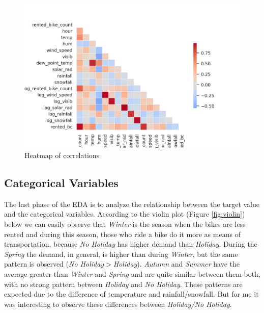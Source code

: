 \documentclass[11pt, a4]{article}
\begin{document}
\begin{figure}[!h]
\includegraphics[]{heatmap}
\centering
\caption{Heatmap of correlations}
\label{fig:heatmap}
\end{figure}


\subsection*{Categorical Variables}

The last phase of the EDA is to analyze the relationship between the target value and the categorical variables. According to the violin plot (Figure \ref{fig:violin}) below we can easily observe that \textit{Winter} is the season when the bikes are less rented and during this season, those who ride a bike do it more as means of transportation, because \textit{No Holiday} has higher demand than \textit{Holiday}. During the \textit{Spring} the demand, in general, is higher than during \textit{Winter}, but the same pattern is observed (\textit{No Holiday}$>$\textit{Holiday}). \textit{Autumn} and \textit{Summer} have the average greater than \textit{Winter} and \textit{Spring} and are quite similar between them both, with no strong pattern between \textit{Holiday} and \textit{No Holiday}. These patterns are expected due to the difference of temperature and rainfall/snowfall. But for me it was interesting to observe these differences between \textit{Holiday/No Holiday}.
 
\end{document}
